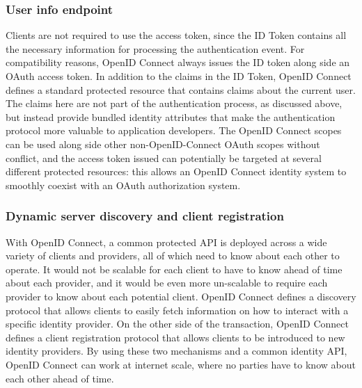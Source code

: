 \documentclass[a4paper, 10pt, titlepage]{article}
\begin{document}
\subsubsection{User info endpoint}
Clients are not required to use the access token, since the ID Token contains all the necessary information for processing the authentication event. For compatibility reasons, OpenID Connect always issues the ID token along side an OAuth access token.
In addition to the claims in the ID Token, OpenID Connect defines a standard protected resource that contains claims about the current user. The claims here are not part of the authentication process, as discussed above, but instead provide bundled identity attributes that make the authentication protocol more valuable to application developers. The OpenID Connect scopes can be used along side other non-OpenID-Connect OAuth scopes without conflict, and the access token issued can potentially be targeted at several different protected resources: this allows an OpenID Connect identity system to smoothly coexist with an OAuth authorization system.

\subsubsection{Dynamic server discovery and client registration}
With OpenID Connect, a common protected API is deployed across a wide variety of clients and providers, all of which need to know about each other to operate. It would not be scalable for each client to have to know ahead of time about each provider, and it would be even more un-scalable to require each provider to know about each potential client. OpenID Connect defines a discovery protocol that allows clients to easily fetch information on how to interact with a specific identity provider. On the other side of the transaction, OpenID Connect defines a client registration protocol that allows clients to be introduced to new identity providers. By using these two mechanisms and a common identity API, OpenID Connect can work at internet scale, where no parties have to know about each other ahead of time.
\end{document}
